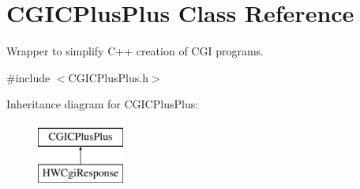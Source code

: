\hypertarget{class_c_g_i_c_plus_plus}{\section{\-C\-G\-I\-C\-Plus\-Plus \-Class \-Reference}
\label{class_c_g_i_c_plus_plus}
}


\-Wrapper to simplify \-C++ creation of \-C\-G\-I programs.  




{\ttfamily \#include $<$\-C\-G\-I\-C\-Plus\-Plus.\-h$>$}

\-Inheritance diagram for \-C\-G\-I\-C\-Plus\-Plus\-:\begin{figure}[H]
\begin{center}
\leavevmode
\includegraphics[height=2.000000cm]{class_c_g_i_c_plus_plus}
\end{center}
\end{figure}
